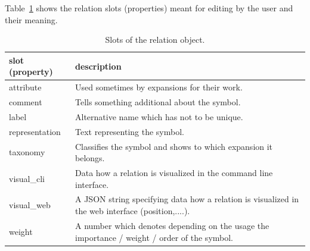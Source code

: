 \documentclass[a4paper, 12pt, openany]{scrbook}
\begin{document}
Table~\ref{tab:relation} shows the relation slots (properties) meant for editing by the user and their meaning.
\begin{table}[htbp]
\centering
\begin{tabular}{|p{4cm}|p{12cm}|}
  \hline
  \textbf{slot (property)} & \textbf{description} \\
  \hline
  attribute & Used sometimes by expansions for their work. \\
  \hline
  comment & Tells something additional about the symbol. \\
  \hline
  label & Alternative name which has not to be unique. \\
  \hline
  representation & Text representing the symbol. \\
  \hline
  taxonomy & Classifies the symbol and shows to which expansion it belongs. \\
  \hline
  visual\_cli & Data how a relation is visualized in the command line interface. \\
  \hline
  visual\_web & A JSON string specifying data how a relation is visualized in the web interface (position,....). \\
  \hline
  weight & A number which denotes depending on the usage the importance / weight / order of the symbol. \\
  \hline
\end{tabular}
\caption{Slots of the relation object.}
\label{tab:relation}
\end{table}
\end{document}
